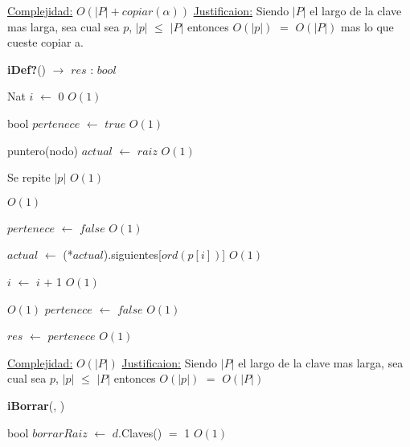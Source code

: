 \begin{Algoritmos}
\begin{algorithm}[H]
\begin{algorithmic}[1]
\medskip
\State \underline{Complejidad:} $O(|P| + copiar(\alpha))$
\State \underline{Justificaion:} Siendo $|P|$ el largo de la clave mas larga, sea cual sea $p$, $|p|$ $\leq$ $|P|$ entonces 	$O(|p|)$ $=$ $O(|P|)$ mas lo que cueste copiar a.


\end{algorithmic}
\end{algorithm}  
  
  
\begin{algorithm}[H]
{\textbf{iDef?}() $\to$ $res$ : $bool$}
\begin{algorithmic}[1]

\State Nat $i$ $\gets$ $0$ \Comment $O(1)$

\State bool $pertenece$ $\gets$ $true$ \Comment $O(1)$

\State puntero(nodo) $actual$ $\gets$ $raiz$ \Comment $O(1)$ 

   \Comment Se repite $|p|$ $O(1)$
		
	
	 \Comment $O(1)$

		\State $pertenece$ $\gets$ $false$ \Comment $O(1)$	 
	
	\EndIf
	
	\State $actual$ $\gets$ (*$actual$).siguientes[$ord(p[i])$] \Comment $O(1)$

	\State $i$ $\gets$ $i$ $+$ 1 \Comment $O(1)$
\EndWhile 

 \Comment $O(1)$ 
	\State $pertenece$ $\gets$ $false$ \Comment $O(1)$
\EndIf

\State $res$ $\gets$ $pertenece$ \Comment $O(1)$ 

\medskip
\State \underline{Complejidad:} $O(|P|)$
\State \underline{Justificaion:} Siendo $|P|$ el largo de la clave mas larga, sea cual sea $p$, $|p|$ $\leq$ $|P|$ entonces 	$O(|p|)$ $=$ $O(|P|)$

\end{algorithmic}
\end{algorithm}



\begin{algorithm}[H]
{\textbf{iBorrar}(, })
\begin{algorithmic}[1]

\State bool $borrarRaiz$ $\gets$ $d$.Claves() $=$ 1 \Comment $O(1)$


\end{algorithmic}
\end{algorithm}
\end{Algoritmos}
